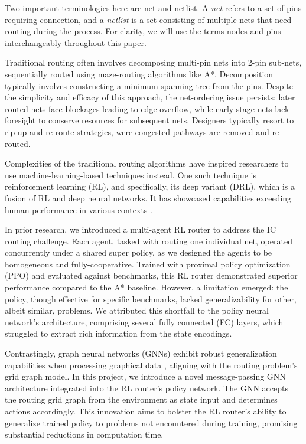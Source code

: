 \documentclass[letterpaper]{article}
\begin{document}
Two important terminologies here are net and netlist. A {\it net} refers to a set of pins requiring connection, and a {\it netlist} is a set consisting of multiple nets that need routing during the process. For clarity, we will use the terms {nodes} and {pins} interchangeably throughout this paper.

Traditional routing often involves decomposing multi-pin nets into 2-pin sub-nets, sequentially routed using maze-routing algorithms like A*. Decomposition typically involves constructing a minimum spanning tree from the pins. Despite the simplicity and efficacy of this approach, the net-ordering issue persists: later routed nets face blockages leading to edge overflow, while early-stage nets lack foresight to conserve resources for subsequent nets. Designers typically resort to rip-up and re-route strategies, were congested pathways are removed and re-routed.

Complexities of the traditional routing algorithms have inspired researchers to use machine-learning-based techniques instead. One such technique is reinforcement learning (RL), and specifically, its deep variant (DRL), which is a fusion of RL and deep neural networks. It has showcased capabilities exceeding human performance in various contexts \cite{mnih2013playing}.

In prior research, we introduced a multi-agent RL router to address the IC routing challenge. Each agent, tasked with routing one individual net, operated concurrently under a shared super policy, as we designed the agents to be homogeneous and fully-cooperative. Trained with proximal policy optimization (PPO) \cite{Schulman2017} and evaluated against benchmarks, this RL router demonstrated superior performance compared to the A* baseline. However, a limitation emerged: the policy, though effective for specific benchmarks, lacked generalizability for other, albeit similar, problems. We attributed this shortfall to the policy neural network's architecture, comprising several fully connected (FC) layers, which struggled to extract rich information from the state encodings.

Contrastingly, graph neural networks (GNNs) exhibit robust generalization capabilities when processing graphical data \cite{Almasan2022,Wang2018}, aligning with the routing problem’s grid graph model. In this project, we introduce a novel message-passing GNN architecture integrated into the RL router’s policy network. The GNN accepts the routing grid graph from the environment as state input and determines actions accordingly. This innovation aims to bolster the RL router’s ability to generalize trained policy to problems not encountered during training, promising substantial reductions in computation time.
\end{document}
